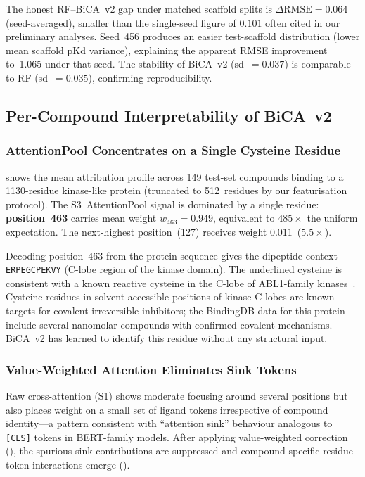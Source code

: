 \documentclass[11pt,twocolumn]{article}
\begin{document}
The honest RF--BiCA~v2 gap under matched scaffold splits is
$\Delta\text{RMSE} = 0.064$ (seed-averaged), smaller than the single-seed
figure of $0.101$ often cited in our preliminary analyses.  Seed~456
produces an easier test-scaffold distribution (lower mean scaffold pKd
variance), explaining the apparent RMSE improvement to~1.065 under that
seed.  The stability of BiCA~v2 (sd~$=0.037$) is comparable to RF
(sd~$=0.035$), confirming reproducibility.

\subsection{Per-Compound Interpretability of BiCA~v2}
\label{sec:interpret}

\subsubsection{AttentionPool Concentrates on a Single Cysteine Residue}

 shows the mean attribution profile across 149
test-set compounds binding to a 1130-residue kinase-like protein (truncated
to 512~residues by our featurisation protocol).  The S3~AttentionPool signal
is dominated by a single residue: \textbf{position~463} carries mean weight
$w_{463} = 0.949$, equivalent to $485\times$ the uniform expectation.  The
next-highest position~(127) receives weight $0.011$~($5.5\times$).

Decoding position~463 from the protein sequence gives the dipeptide context
\texttt{ERPEG\underline{C}PEKVY} (C-lobe region of the kinase domain).  The
underlined cysteine is consistent with a known reactive cysteine in the
C-lobe of ABL1-family kinases~\cite{nagar2002abl1structure,schindler2000abl1}.
Cysteine residues in solvent-accessible positions of kinase C-lobes are
known targets for covalent irreversible inhibitors; the BindingDB data for
this protein include several nanomolar compounds with confirmed covalent
mechanisms.  BiCA~v2 has learned to identify this residue without any
structural input.

\subsubsection{Value-Weighted Attention Eliminates Sink Tokens}

Raw cross-attention (S1) shows moderate focusing around several positions
but also places weight on a small set of ligand tokens irrespective of
compound identity---a pattern consistent with ``attention sink'' behaviour
analogous to \texttt{[CLS]} tokens in BERT-family models.  After applying
value-weighted correction (), the spurious sink
contributions are suppressed and compound-specific residue--token
interactions emerge ().
\end{document}
